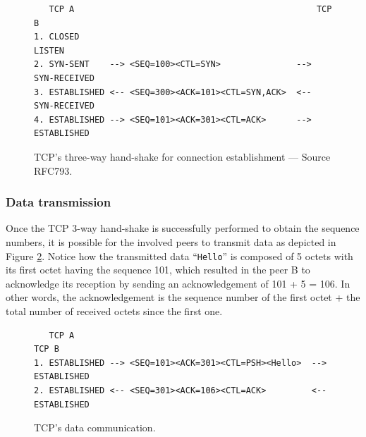 \documentclass[pdftex,12pt,a4paper]{article}
\begin{document}
                \begin{figure}[tbh]
                        \centering
                        \small\begin{verbatim}   TCP A                                                TCP B
1. CLOSED                                               LISTEN
2. SYN-SENT    --> <SEQ=100><CTL=SYN>               --> SYN-RECEIVED
3. ESTABLISHED <-- <SEQ=300><ACK=101><CTL=SYN,ACK>  <-- SYN-RECEIVED
4. ESTABLISHED --> <SEQ=101><ACK=301><CTL=ACK>      --> ESTABLISHED\end{verbatim}\normalsize
                \vspace{-15pt}
                \caption{TCP's three-way hand-shake for connection
                establishment --- Source RFC793.}
                \label{fig:tcpsyn}
                \end{figure}

            \subsubsection{Data transmission}
                Once the TCP 3-way hand-shake is successfully performed to
                obtain the sequence numbers, it is possible for the involved
                peers to transmit data as depicted in Figure \ref{fig:tcppsh}.
                Notice how the transmitted data ``\texttt{Hello}'' is composed
                of 5 octets with its first octet having the sequence 101, which
                resulted in the peer B to acknowledge its  reception by sending
                an acknowledgement of 101 + 5 = 106. In other words, the
                acknowledgement is the sequence number of the first octet +
                the total number of received octets since the first one.

                \begin{figure}[tbh]
                        \centering
                        \small\begin{verbatim}   TCP A                                                   TCP B
1. ESTABLISHED --> <SEQ=101><ACK=301><CTL=PSH><Hello>  --> ESTABLISHED
2. ESTABLISHED <-- <SEQ=301><ACK=106><CTL=ACK>         <-- ESTABLISHED\end{verbatim}\normalsize
                \vspace{-15pt}
                \caption{TCP's data communication.}
                \label{fig:tcppsh}
                \end{figure}
\end{document}
